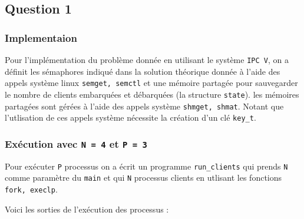 \subsection{Question 1}
\subsubsection{Implementaion}
Pour l'implémentation du problème donnée en utilisant le système \texttt{IPC V},
on a définit les sémaphores indiqué dans la solution théorique donnée à l'aide
des appels système  linux \texttt{semget, semctl} et une mémoire partagée pour
sauvegarder le nombre de clients embarquées et débarquées (la structure
\texttt{state}). les mémoires partagées sont gérées à l'aide des appels système 
\texttt{shmget, shmat}. Notant que l'utlisation de ces appels système nécessite la création d'un clé \texttt{key\_t}.

\subsubsection{Exécution avec \texttt{N = 4} et \texttt{P = 3}}
Pour exécuter \texttt{P} processus on a écrit un programme \texttt{run\_clients}
qui prends \texttt{N} comme  paramètre du \texttt{main} et qui \texttt{N}
processus clients en utlisant les fonctions \texttt{fork, execlp}.

Voici les sorties de l'exécution des processus :





